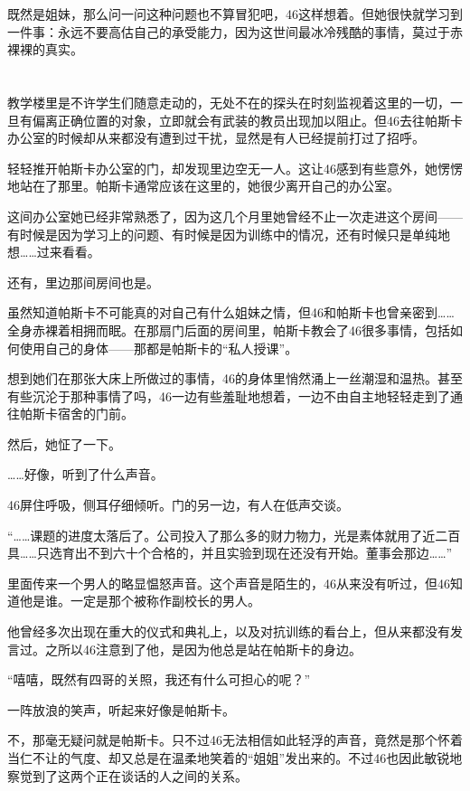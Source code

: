 既然是姐妹，那么问一问这种问题也不算冒犯吧，46这样想着。但她很快就学习到一件事：永远不要高估自己的承受能力，因为这世间最冰冷残酷的事情，莫过于赤裸裸的真实。

\section*{}

教学楼里是不许学生们随意走动的，无处不在的探头在时刻监视着这里的一切，一旦有偏离正确位置的对象，立即就会有武装的教员出现加以阻止。但46去往帕斯卡办公室的时候却从来都没有遭到过干扰，显然是有人已经提前打过了招呼。

轻轻推开帕斯卡办公室的门，却发现里边空无一人。这让46感到有些意外，她愣愣地站在了那里。帕斯卡通常应该在这里的，她很少离开自己的办公室。

这间办公室她已经非常熟悉了，因为这几个月里她曾经不止一次走进这个房间——有时候是因为学习上的问题、有时候是因为训练中的情况，还有时候只是单纯地想……过来看看。

还有，里边那间房间也是。

虽然知道帕斯卡不可能真的对自己有什么姐妹之情，但46和帕斯卡也曾亲密到……全身赤裸着相拥而眠。在那扇门后面的房间里，帕斯卡教会了46很多事情，包括如何使用自己的身体——那都是帕斯卡的“私人授课”。

想到她们在那张大床上所做过的事情，46的身体里悄然涌上一丝潮湿和温热。甚至有些沉沦于那种事情了吗，46一边有些羞耻地想着，一边不由自主地轻轻走到了通往帕斯卡宿舍的门前。

然后，她怔了一下。

……好像，听到了什么声音。

46屏住呼吸，侧耳仔细倾听。门的另一边，有人在低声交谈。

“……课题的进度太落后了。公司投入了那么多的财力物力，光是素体就用了近二百具……只选育出不到六十个合格的，并且实验到现在还没有开始。董事会那边……”

里面传来一个男人的略显愠怒声音。这个声音是陌生的，46从来没有听过，但46知道他是谁。一定是那个被称作副校长的男人。

他曾经多次出现在重大的仪式和典礼上，以及对抗训练的看台上，但从来都没有发言过。之所以46注意到了他，是因为他总是站在帕斯卡的身边。

“嘻嘻，既然有四哥的关照，我还有什么可担心的呢？”

一阵放浪的笑声，听起来好像是帕斯卡。

不，那毫无疑问就是帕斯卡。只不过46无法相信如此轻浮的声音，竟然是那个怀着当仁不让的气度、却又总是在温柔地笑着的“姐姐”发出来的。不过46也因此敏锐地察觉到了这两个正在谈话的人之间的关系。

